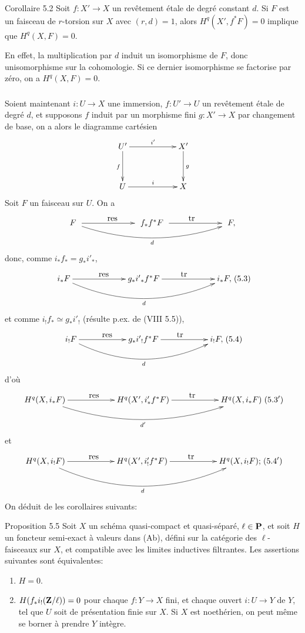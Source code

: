 \documentclass[10pt]{../fichiers-configuration-latex/smfart}
\begin{document}
\begin{enonce*}{Corollaire 5.2}
Soit $f:X'\rightarrow X$ un revêtement étale de degré constant $d$. Si
$F$ est un faisceau de $r$-torsion sur $X$ avec $(r,d)=1$, alors
$H^q(X',f^{\ast} F)=0$ implique que $H^q(X,F)=0$.
\end{enonce*}

En effet, la multiplication par $d$ induit un isomorphisme de $F$,
donc un\pageoriginale isomorphisme sur la cohomologie. Si ce dernier
isomorphisme se factorise par zéro, on a $H^q(X,F)=0$.

\setcounter{subsection}{2}
\subsubsection{}
Soient maintenant $i:U\rightarrow X$ une immersion, $f:U'\rightarrow
U$ un revêtement étale de degré $d$, et supposons $f$ induit par un
morphisme fini $g:X'\rightarrow X$ par changement de base, \ie on a
alors le diagramme cartésien
$$
\xymatrix@C=2cm@R=1.25cm{
U' \ar[r]^{i'}\ar[d]_{f}& X'\ar[d]^{g}\\
U  \ar[r]^{i}& X
}
$$
Soit $F$ un faisceau sur $U$. On a
$$
\xymatrix@C=2.25cm@M=.25cm{
F \ar[r]^{\txt{res}} \ar@/_1.5pc/[rr]_{d}& f_{\ast}f^{\ast}F
\ar[r]^{\txt{tr}}& F,
}
$$
donc, comme $i_{\ast}f_{\ast}=g_{\ast}i'_{\ast}$,
$$
\xymatrix@C=2.25cm{
i_{\ast}F \ar@/_2pc/[rr]_{d} \ar[r]^{\txt{res}}& g_{\ast}i' {}_{\ast}f^{\ast}F \ar[r]^{\txt{tr}}& i_{\ast}F,
}\leqno{(5.3)}
$$
et comme $i_{!}f_{\ast}\simeq g_{\ast}i'_{!}$ (résulte p.ex. de (VIII
5.5)),
$$
\xymatrix@C=2cm{
i_{!}F \ar@/_2pc/[rr]_{d} \ar[r]^{\txt{res}}& g_{\ast}i' {}_{!}f^{\ast}F \ar[r]^{\txt{tr}}& i_{!}F,
}\leqno{(5.4)}
$$
d'où
$$
\xymatrix@C=2cm{
H^{q}(X,i_{\ast} F) \ar@/_2pc/[rr]_{d'} \ar[r]^{\txt{res}}& H^{q}(X', i' _{\ast}f^{\ast}F) \ar[r]^{\txt{tr}}& H^q(X,i_{\ast}F)
}\leqno{(5.3')}
$$\label{5.3'}
et\pageoriginale
$$
\xymatrix@C=2cm{
H^{q}(X,i_{!} F) \ar[r]^{\txt{res}} \ar@/_2.5pc/[rr]_{d}& H^{q}(X', i' _{!}f^{\ast}F)
\ar[r]^{\txt{tr}}& H^q(X,i_{!}F) ;
}\leqno{(5.4')}
$$\label{5.4'}
On déduit de  les corollaires suivants:

\begin{enonce*}{Proposition 5.5}
Soit $X$ un schéma quasi-compact et quasi-séparé, $\ell \in
\mathbf{P}$, et soit $H$ un foncteur semi-exact à valeurs
dans {\rm (Ab)}, défini sur la catégorie des $\ell$-faisceaux sur $X$,
et compatible avec les limites inductives filtrantes. Les assertions
suivantes sont équivalentes:
\begin{enumerate}
\renewcommand{\theenumi}{\roman{enumi}}
\renewcommand{\labelenumi}{(\theenumi)}
\item $H=0$.

\item $H(f_{\ast}i_{!}(\mathbf{Z}/\ell))=0$ pour chaque
$f:Y\rightarrow X$ fini, et chaque ouvert $i:U\rightarrow Y$ de $Y$,
tel que $U$ soit de présentation finie sur $X$. Si $X$ est noethérien,
on peut même se borner à prendre $Y$ intègre.
\end{enumerate}
\end{enonce*}
\end{document}
